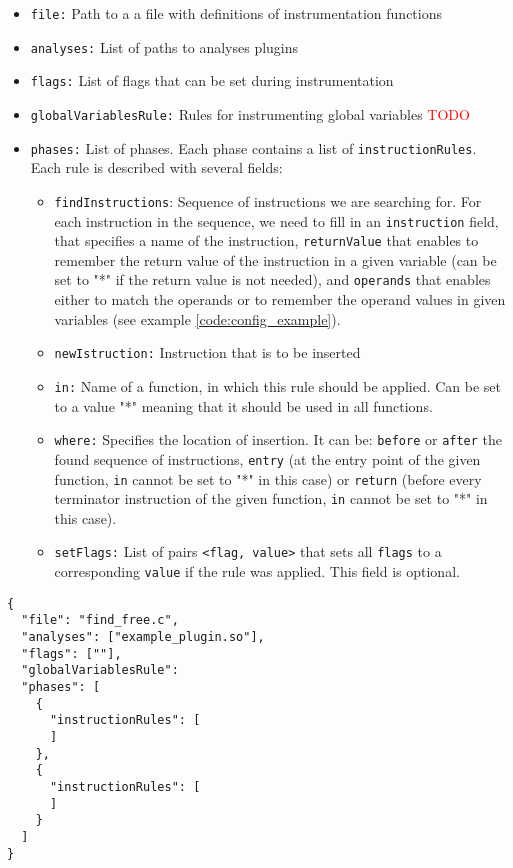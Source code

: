\medskip
\begin{itemize}
\item \texttt{file:} Path to a a file with definitions of instrumentation functions
\item \texttt{analyses:} List of paths to analyses plugins
\item \texttt{flags:} List of flags that can be set during instrumentation
\item \texttt{globalVariablesRule:} Rules for instrumenting global
  variables \textcolor{red}{TODO}
\item \texttt{phases:} List of phases. Each phase contains a
  list of \texttt{instructionRules}. Each rule is described with several fields:
  \begin{itemize}
  	\item \texttt{findInstructions}: Sequence of instructions we are searching
	  for. For each instruction in the sequence, we need to fill in an
      \texttt{instruction} field, that specifies a name of the instruction,
      \texttt{returnValue} that enables to remember the return value of the
      instruction in a given variable (can be set to "*" if the return value is not
      needed), and \texttt{operands} that enables either to match the operands or to
      remember the operand values in given variables (see example
      \ref{code:config_example}).
    \item \texttt{newIstruction:} Instruction that is to be inserted
    \item \texttt{in:} Name of a function, in which this rule should be
      applied. Can be set to a value "*" meaning that it should be used in all functions.
    \item \texttt{where:} Specifies the location of insertion. It can be:
      \texttt{before} or \texttt{after} the found sequence of instructions,
      \texttt{entry} (at the entry point of the given function, \texttt{in}
      cannot be set to "*" in this case) or \texttt{return} (before every
      terminator instruction of the given function, \texttt{in} cannot be set to
      "*" in this case).
    \item \texttt{setFlags:} List of pairs \texttt{<flag, value>} that sets
      all \texttt{flags} to a corresponding \texttt{value} if the rule was
      applied. This field is optional.
  \end{itemize}
\end{itemize}
\medskip

\begin{lstlisting}
{
  "file": "find_free.c",
  "analyses": ["example_plugin.so"],
  "flags": [""],
  "globalVariablesRule":
  "phases": [
    {
      "instructionRules": [
      ]
    },
    {
      "instructionRules": [
      ]
    }
  ]
}
\end{lstlisting}
